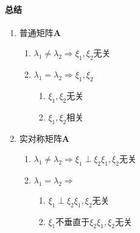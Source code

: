 \documentclass[oneside, onecolumn]{ctexbook}
\begin{document}
\paragraph{总结} 
\begin{enumerate}
	\item 普通矩阵$ \bm{A} $
	\begin{enumerate}
		\item $ \lambda_{1}\neq \lambda_{2}\Rightarrow \xi_{1}, \xi_{2}$无关
		\item $ \lambda_{1}= \lambda_{2}\Rightarrow \xi_{1}, \xi_{2}$
		\begin{enumerate}
			\item $\xi_{1}, \xi_{2}$无关
			\item $\xi_{1}, \xi_{2}$相关
		\end{enumerate}
	\end{enumerate}
    \item 实对称矩阵$ \bm{A} $
    \begin{enumerate}
    	\item $ \lambda_{1}\neq \lambda_{2}\Rightarrow \xi_{1}\perp \xi_{2}$\quad $\xi_{1}, \xi_{2}$无关
    	\item $ \lambda_{1}= \lambda_{2}\Rightarrow$ 
    	\begin{enumerate}
    		\item $\xi_{1}\perp \xi_{2}$\quad $\xi_{1}, \xi_{2}$无关
    		\item $\xi_{1}$不垂直于$\xi_{2}$\quad $\xi_{1}, \xi_{2}$无关
    	\end{enumerate}
    \end{enumerate}
\end{enumerate}
\end{document}
